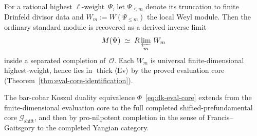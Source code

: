 \begin{conjecture}
\label{conj:pro-weyl-recovery}
For a rational highest $\ell$-weight~$\Psi$, let
$\Psi_{\leq m}$ denote its truncation to finite Drinfeld divisor
data and $W_m := W(\Psi_{\leq m})$ the local Weyl module.
Then the ordinary standard module is recovered as a derived
inverse limit
\[
M(\Psi) \;\simeq\; R\varprojlim_m\, W_m
\]
inside a separated completion of~$\mathcal{O}$.
Each $W_m$ is universal finite-dimensional highest-weight, hence lies
in $\operatorname{thick}\langle \mathrm{Ev} \rangle$ by the proved
evaluation core (Theorem~\ref{thm:eval-core-identification}).
\end{conjecture}

\begin{conjecture}
\label{conj:dk-compacts-completion}
The bar-cobar Koszul duality equivalence
$\Phi$~\eqref{eq:dk-eval-core} extends from the finite-dimensional
evaluation core to the full completed shifted-prefundamental core
$\mathcal{G}_{\mathrm{shift}}$, and then by pro-nilpotent completion
in the sense of Francis--Gaitsgory to the completed Yangian category.
\end{conjecture}

